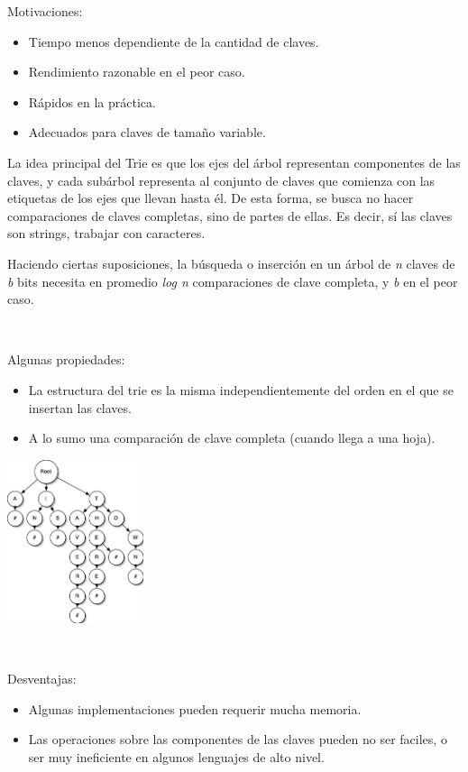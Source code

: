 Motivaciones:
\begin{itemize}
 \item Tiempo menos dependiente de la cantidad de claves.
 \item Rendimiento razonable en el peor caso.
 \item R\'apidos en la pr\'actica.
 \item Adecuados para claves de tamaño variable.
\end{itemize}

La idea principal del Trie es que los ejes del \'arbol representan componentes de las claves, y cada sub\'arbol representa al conjunto de claves que comienza con las etiquetas de los ejes que llevan hasta \'el. 
De esta forma, se busca no hacer comparaciones de claves completas, sino de partes de ellas. Es decir, s\'i las claves son strings, trabajar con caracteres.

Haciendo ciertas suposiciones, la b\'usqueda o inserci\'on en un \'arbol de \textit{n} claves de \textit{b} bits necesita en promedio \textit{log n} comparaciones de clave completa, y \textit{b} en el peor caso.

~

Algunas propiedades:
\begin{itemize}
 \item La estructura del trie es la misma independientemente del orden en el que se insertan las claves.
 \item A lo sumo una comparaci\'on de clave completa (cuando llega a una hoja).
\end{itemize}

\begin{center}
 \includegraphics[width=0.3\textwidth, height=0.4\textwidth]{./graficos/trie-simple.png}
\end{center}

~

Desventajas:
\begin{itemize}
 \item Algunas implementaciones pueden requerir mucha memoria.
 \item Las operaciones sobre las componentes de las claves pueden no ser faciles, o ser muy ineficiente en algunos lenguajes de alto nivel.
\end{itemize}

